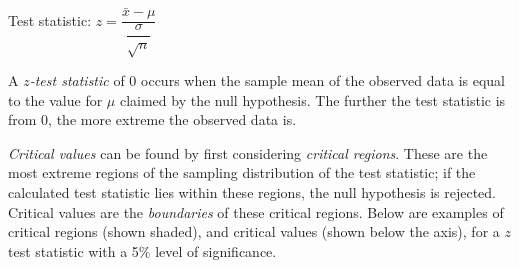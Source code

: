 \documentclass[
  11pt,
]{book}
\begin{document}
\begin{centering}
\begin{tcolorbox}[adjusted title=For a one-sample $z$-test for the population mean:, halign title = center,colback=red!5,colframe=red!70!black, halign = center]
Test statistic: $z=\dfrac{\bar{x}-\mu}{\dfrac{\sigma}{\sqrt{n}}}$
\end{tcolorbox}
\end{centering}

A \(z\)\emph{-test statistic} of 0 occurs when the sample mean of the observed data is equal to the value for \(\mu\) claimed by the null hypothesis. The further the test statistic is from 0, the more extreme the observed data is.

\emph{Critical values} can be found by first considering \emph{critical regions}. These are the most extreme regions of the sampling distribution of the test statistic; if the calculated test statistic lies within these regions, the null hypothesis is rejected. Critical values are the \emph{boundaries} of these critical regions. Below are examples of critical regions (shown shaded), and critical values (shown below the axis), for a \(z\) test statistic with a 5\% level of significance.
\end{document}

